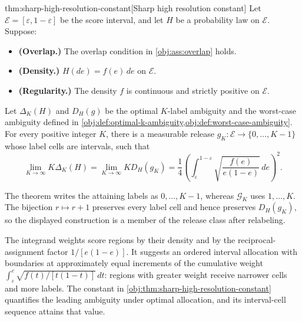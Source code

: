 \begin{theoremv}{thm:sharp-high-resolution-constant}[Sharp high resolution constant]
Let \(\mathcal E=[\varepsilon,1-\varepsilon]\) be the score interval, and let \(H\) be a probability law on \(\mathcal E\). Suppose:
\begin{itemize}
\item \textbf{(Overlap.)} The overlap condition in \cref{obj:ass:overlap} holds.
\item \textbf{(Density.)} \(H(de)=f(e)\,de\) on \(\mathcal E\).
\item \textbf{(Regularity.)} The density \(f\) is continuous and strictly positive on \(\mathcal E\).
\end{itemize}
Let \(\Delta_K(H)\) and \(D_H(g)\) be the optimal \(K\)-label ambiguity and the worst-case ambiguity defined in \cref{obj:def:optimal-k-ambiguity,obj:def:worst-case-ambiguity}. For every positive integer \(K\), there is a measurable release \(g_K:\mathcal E\to\{0,\ldots,K-1\}\) whose label cells are intervals, such that
\[
\lim_{K\to\infty}K\Delta_K(H)
=
\lim_{K\to\infty}K D_H(g_K)
=
\frac14\left(
\int_{\varepsilon}^{1-\varepsilon}
\sqrt{\frac{f(e)}{e(1-e)}}\,de
\right)^2.
\]
\end{theoremv}

The theorem writes the attaining labels as \(0,\ldots,K-1\), whereas \(\mathcal G_K\) uses \(1,\ldots,K\). The bijection \(r\mapsto r+1\) preserves every label cell and hence preserves \(D_H(g_K)\), so the displayed construction is a member of the release class after relabeling.

The integrand weights score regions by their density and by the reciprocal-assignment factor \(1/[e(1-e)]\). It suggests an ordered interval allocation with boundaries at approximately equal increments of the cumulative weight \(\int_{\varepsilon}^{e}\sqrt{f(t)/[t(1-t)]}\,dt\): regions with greater weight receive narrower cells and more labels. The constant in \cref{obj:thm:sharp-high-resolution-constant} quantifies the leading ambiguity under optimal allocation, and its interval-cell sequence attains that value.
